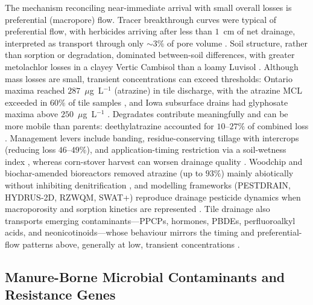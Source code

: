 \documentclass[11pt]{article}
\begin{document}
The mechanism reconciling near-immediate arrival with small overall losses is
preferential (macropore) flow. Tracer breakthrough curves were typical of
preferential flow, with herbicides arriving after less than $1$~cm of net
drainage, interpreted as transport through only $\sim3\%$ of pore volume
\parencite{Fortin2002,Dousset2004}. Soil structure, rather than sorption or
degradation, dominated between-soil differences, with greater metolachlor losses
in a clayey Vertic Cambisol than a loamy Luvisol \parencite{Novak2001,Novak2003}.
Although mass losses are small, transient concentrations can exceed thresholds:
Ontario maxima reached $287$~$\mu$g~L$^{-1}$ (atrazine) in tile discharge, with
the atrazine MCL exceeded in $60\%$ of tile samples \parencite{GAYNOR1995}, and
Iowa subsurface drains had glyphosate maxima above $250$~$\mu$g~L$^{-1}$
\parencite{Coupe2012}. Degradates contribute meaningfully and can be more mobile
than parents: deethylatrazine accounted for $10$--$27\%$ of combined loss
\parencite{GAYNOR1995,MUIR1978,JAYACHANDRAN1994}. Management levers include
banding, residue-conserving tillage with intercrops (reducing loss
$46$--$49\%$), and application-timing restriction via a soil-wetness index
\parencite{Gaynor2001,Julien2023,Moorman1999}, whereas corn-stover harvest can
worsen drainage quality \parencite{Shipitalo2016}. Woodchip and biochar-amended
bioreactors removed atrazine (up to $93\%$) mainly abiotically without inhibiting
denitrification \parencite{Hassanpour2019,Ilhan2011}, and modelling frameworks
(PESTDRAIN, HYDRUS-2D, RZWQM, SWAT+) reproduce drainage pesticide dynamics when
macroporosity and sorption kinetics are represented
\parencite{Branger2009,Boivin2006,Wendell2024,Novak2003}. Tile drainage also
transports emerging contaminants---PPCPs, hormones, PBDEs, perfluoroalkyl acids,
and neonicotinoids---whose behaviour mirrors the timing and preferential-flow
patterns above, generally at low, transient concentrations
\parencite{Gottschall2012,Gottschall2013,Gottschall2017,Ghirardini2019,Schaafsma2019}.

\subsection{Manure-Borne Microbial Contaminants and Resistance Genes}
\end{document}
